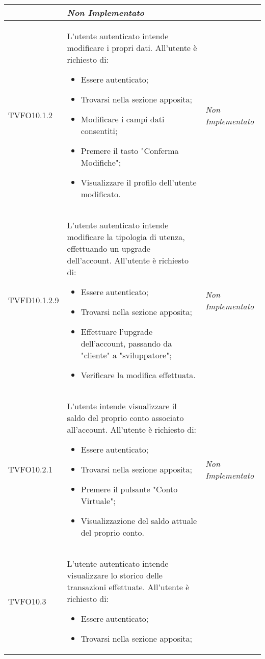 \begin{longtable}{|>{\centering\arraybackslash}p{2cm}|>{\centering\arraybackslash}p{7.5cm} | >{\centering\arraybackslash}p{4cm}|}
\begin{itemize}
		\end{itemize} & \textit{Non Implementato}\\ \hline
		\hypertarget{TVFO10.1.2}{TVFO10.1.2} & L’utente autenticato intende modificare i propri dati. All’utente è richiesto di:
		\begin{itemize}
			\item Essere autenticato;
			\item Trovarsi nella sezione apposita;
			\item Modificare i campi dati consentiti;
			\item Premere il tasto "Conferma Modifiche";
			\item Visualizzare il profilo dell’utente modificato.
		\end{itemize}
		& \textit{Non Implementato}\\ \hline
		\hypertarget{TVFD10.1.2.9}{TVFD10.1.2.9} & L’utente autenticato  intende modificare la tipologia di utenza, effettuando un upgrade dell'account. All’utente è richiesto di:
		\begin{itemize}
			\item Essere autenticato;
			\item Trovarsi nella sezione apposita;
			\item Effettuare l'upgrade dell'account, passando da "cliente" a "sviluppatore";
			\item Verificare la modifica effettuata.
		\end{itemize} & \textit{Non Implementato}\\ \hline
		\hypertarget{TVFO10.2.1}{TVFO10.2.1} & L’utente intende visualizzare il saldo del proprio conto associato all'account. All’utente è richiesto di:
		\begin{itemize}
			\item Essere autenticato;
			\item Trovarsi nella sezione apposita;
			\item Premere il pulsante "Conto Virtuale";
			\item Visualizzazione del saldo attuale del proprio conto.
		\end{itemize} & \textit{Non Implementato}\\ \hline
		\hypertarget{TVFO10.3}{TVFO10.3} & L’utente autenticato intende visualizzare lo storico delle transazioni effettuate. All’utente è richiesto di:
		\begin{itemize}
			\item Essere autenticato;
			\item Trovarsi nella sezione apposita;

\end{itemize}
\end{longtable}
